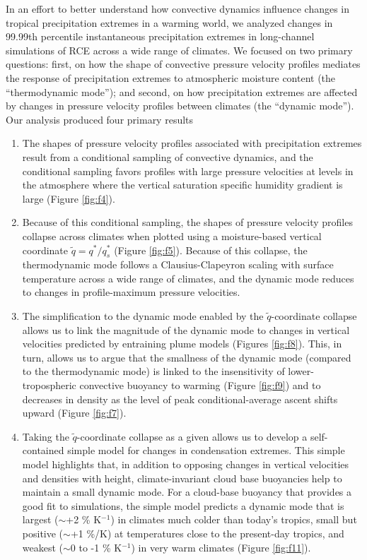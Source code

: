 \documentclass[twocol]{ametsoc}
\begin{document}
In an effort to better understand how convective dynamics influence changes in tropical precipitation extremes in a warming world, we analyzed changes in 99.99th percentile instantaneous precipitation extremes in long-channel simulations of RCE across a wide range of climates. We focused on two primary questions: first, on how the shape of convective pressure velocity profiles mediates the response of precipitation extremes to atmospheric moisture content (the ``thermodynamic mode''); and second, on how precipitation extremes are affected by changes in pressure velocity profiles between climates (the ``dynamic mode''). Our analysis produced four primary results
\begin{enumerate}
    \item The shapes of pressure velocity profiles associated with precipitation extremes result from a conditional sampling of convective dynamics, and the conditional sampling favors profiles with large pressure velocities at levels in the atmosphere where the vertical saturation specific humidity gradient is large (Figure \ref{fig:f4}).
    \item Because of this conditional sampling, the shapes of pressure velocity profiles collapse across climates when plotted using a moisture-based vertical coordinate $\tilde{q} = q^*/q^*_s$ (Figure \ref{fig:f5}). Because of this collapse, the thermodynamic mode follows a Clausius-Clapeyron scaling with surface temperature across a wide range of climates, and the dynamic mode reduces to changes in profile-maximum pressure velocities.
    \item The simplification to the dynamic mode enabled by the $\tilde{q}$-coordinate collapse allows us to link the magnitude of the dynamic mode to changes in vertical velocities predicted by entraining plume models (Figures \ref{fig:f8}). This, in turn, allows us to argue that the smallness of the dynamic mode (compared to the thermodynamic mode) is linked to the insensitivity of lower-tropospheric convective buoyancy to warming (Figure \ref{fig:f9}) and to decreases in density as the level of peak conditional-average ascent shifts upward (Figure \ref{fig:f7}).
    \item Taking the $\tilde{q}$-coordinate collapse as a given allows us to develop a self-contained simple model for changes in condensation extremes. This simple model highlights that, in addition to opposing changes in vertical velocities and densities with height, climate-invariant cloud base buoyancies help to maintain a small dynamic mode. For a cloud-base buoyancy that provides a good fit to simulations, the simple model predicts a dynamic mode that is largest ($\sim$+2 \% K$^{-1}$) in climates much colder than today's tropics, small but positive ($\sim$+1 \%/K) at temperatures close to the present-day tropics, and weakest ($\sim$0 to -1 \% K$^{-1}$) in very warm climates (Figure \ref{fig:f11}).
\end{enumerate}
\end{document}
